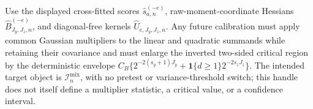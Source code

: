 Use the displayed cross-fitted scores \(\widehat s_{a,n}^{(-e)}\), raw-moment-coordinate Hessians \(\widehat B_{J_y,J_z,n}^{(-e)}\), and diagonal-free kernels \(\widehat U_{e,J_y,J_z,n}\). Any future calibration must apply common Gaussian multipliers to the linear and quadratic summands while retaining their covariance and must enlarge the inverted two-sided critical region by the deterministic envelope \(C_B\{2^{-2(s_y+1)J_y}+\mathbf 1\{d\ge1\}2^{-2s_zJ_z}\}\). The intended target object is \(\mathcal I_n^{\mathrm{mix}}\), with no pretest or variance-threshold switch; this handle does not itself define a multiplier statistic, a critical value, or a confidence interval.